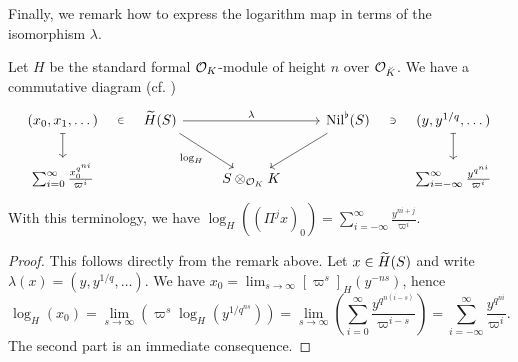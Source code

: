 \documentclass[../main.tex]{subfiles}
\begin{document}
Finally, we remark how to express the logarithm map in terms of the isomorphism
$\lambda$.

\begin{lem}\label{lem:LogInTermsOfNil}
  Let $H$ be the standard formal $\cO_K$-module of height $n$ over $\cO_{\breve K}$. We have a commutative diagram (cf. \cite[Lemma
  2.6.1]{BoyarchenkoWeinstein2011MaxVar})
  \begin{equation*}
  \begin{tikzcd}[ampersand replacement=\&]
  	{(x_0, x_1, \dots)} \& {\Tilde H(S)} \&\& {\Nil^\flat(S)} \& {(y,y^{1/q}, \dots)} \\
  	{\sum_{i=0}^\infty \frac{x_0^{q^{ni}}}{\varpi^i}} \&\& {S\otimes_{\cO_K}K} \&\& {\sum_{i = -\infty}^\infty\frac{y^{q^{ni}}}{\varpi^i}}
  	\arrow["\in"{description}, draw=none, from=1-1, to=1-2]
  	\arrow[maps to, from=1-1, to=2-1]
  	\arrow["\lambda", from=1-2, to=1-4]
  	\arrow["{\log_H}"', from=1-2, to=2-3]
  	\arrow[from=1-4, to=2-3]
  	\arrow["\ni"{description}, draw=none, from=1-5, to=1-4]
  	\arrow[maps to, from=1-5, to=2-5]
  \end{tikzcd}
  \end{equation*}
  With this terminology, we have $\log_H((\Pi^j x)_0) = \sum_{i = -\infty}^\infty
  \frac{ y^{ni + j}}{\varpi^i}$. 
\begin{proof}
  This follows directly from the remark above. Let $x \in \Tilde H(S)$ and write
  $\lambda(x) = (y, y^{1/q}, \dots)$. We have $x_0 = \lim_{s \to \infty}
  [\varpi^s]_H(y^{-ns})$, hence
  \begin{equation*}
    \log_H(x_0) = \lim_{s \to \infty}\left( \varpi^s \log_H(y^{1/q^{ns}})\right) = 
    \lim_{s \to \infty}\left( \sum_{i=0}^\infty  \frac{y^{q^{n(i-s)}}}{\varpi^{i-s}}\right)
    = \sum_{i=-\infty}^\infty \frac{y^{q^{ni}}}{\varpi^i}.
  \end{equation*}
  The second part is an immediate consequence.
\end{proof}
\end{lem}









\end{document}
